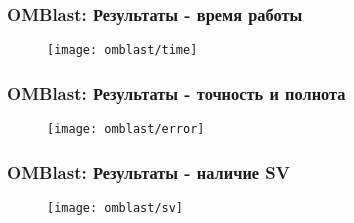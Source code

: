 \begin{frame}
\frametitle{OMBlast: Результаты - время работы}
  \begin{figure}
    \centering
    \texttt{[image: omblast/time]}
  \end{figure}

\end{frame}

\begin{frame}
\frametitle{OMBlast: Результаты - точность и полнота }
  \begin{figure}
    \centering
    \texttt{[image: omblast/error]}
  \end{figure}

\end{frame}

\begin{frame}
\frametitle{OMBlast: Результаты - наличие SV}
  \begin{figure}
    \centering
    \texttt{[image: omblast/sv]}
  \end{figure}

\end{frame}
